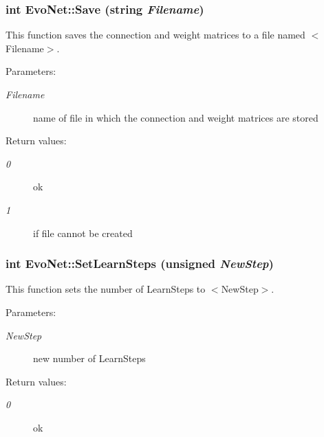 \subsubsection{\setlength{\rightskip}{0pt plus 5cm}int Evo\-Net::Save (string {\em Filename})}\label{classEvoNet_a12}


This function saves the connection and weight matrices to a file named $<$Filename$>$.

\begin{Desc}
\item[Parameters: ]\par
\begin{description}
\item[{\em 
Filename}]name of file in which the connection and weight matrices are stored \end{description}
\end{Desc}
\begin{Desc}
\item[Return values: ]\par
\begin{description}
\item[{\em 
0}]ok \item[{\em 
1}]if file cannot be created \end{description}
\end{Desc}
\subsubsection{\setlength{\rightskip}{0pt plus 5cm}int Evo\-Net::Set\-Learn\-Steps (unsigned {\em New\-Step})}\label{classEvoNet_a15}


This function sets the number of Learn\-Steps to $<$New\-Step$>$.

\begin{Desc}
\item[Parameters: ]\par
\begin{description}
\item[{\em 
New\-Step}]new number of Learn\-Steps \end{description}
\end{Desc}
\begin{Desc}
\item[Return values: ]\par
\begin{description}
\item[{\em 
0}]ok \end{description}
\end{Desc}
